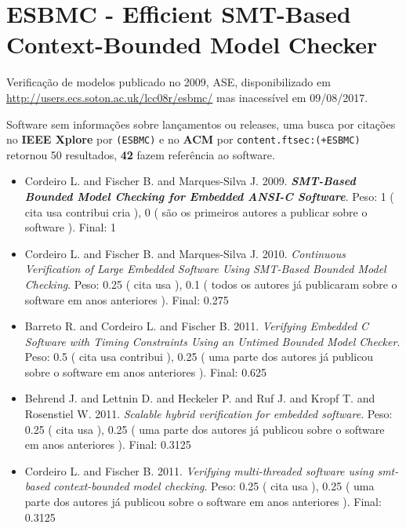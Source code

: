 \section{ESBMC - Efficient SMT-Based Context-Bounded Model Checker}

Verificação de modelos
publicado no 2009, ASE,
disponibilizado em \url{http://users.ecs.soton.ac.uk/lcc08r/esbmc/}
mas inacessível em 09/08/2017.

Software sem informações sobre lançamentos ou releases,
uma busca por citações no {\bf IEEE Xplore} por
\texttt{(ESBMC)}
e no {\bf ACM} por
\texttt{content.ftsec:(+ESBMC)}
retornou
50 resultados,
{\bf 42} fazem referência ao software.

\begin{itemize}
\item Cordeiro L. and Fischer B. and Marques-Silva J.
      2009.
        \textbf{\textit{ SMT-Based Bounded Model Checking for Embedded ANSI-C Software}}.
      Peso:
      1 (
          cita
          usa
          contribui
          cria
      ),
      0 (
são os primeiros autores a publicar sobre o software
      ).
      Final:
      1

\item Cordeiro L. and Fischer B. and Marques-Silva J.
      2010.
        \textit{ Continuous Verification of Large Embedded Software Using SMT-Based Bounded Model Checking}.
      Peso:
      0.25 (
          cita
          usa
      ),
      0.1 (
todos os autores já publicaram sobre o software em anos anteriores
      ).
      Final:
      0.275

\item Barreto R. and Cordeiro L. and Fischer B.
      2011.
        \textit{ Verifying Embedded C Software with Timing Constraints Using an Untimed Bounded Model Checker}.
      Peso:
      0.5 (
          cita
          usa
          contribui
      ),
      0.25 (
uma parte dos autores já publicou sobre o software em anos anteriores
      ).
      Final:
      0.625

\item Behrend J. and Lettnin D. and Heckeler P. and Ruf J. and Kropf T. and Rosenstiel W.
      2011.
        \textit{ Scalable hybrid verification for embedded software}.
      Peso:
      0.25 (
          cita
          usa
      ),
      0.25 (
uma parte dos autores já publicou sobre o software em anos anteriores
      ).
      Final:
      0.3125

\item Cordeiro L. and Fischer B.
      2011.
        \textit{ Verifying multi-threaded software using smt-based context-bounded model checking}.
      Peso:
      0.25 (
          cita
          usa
      ),
      0.25 (
uma parte dos autores já publicou sobre o software em anos anteriores
      ).
      Final:
      0.3125


\end{itemize}
